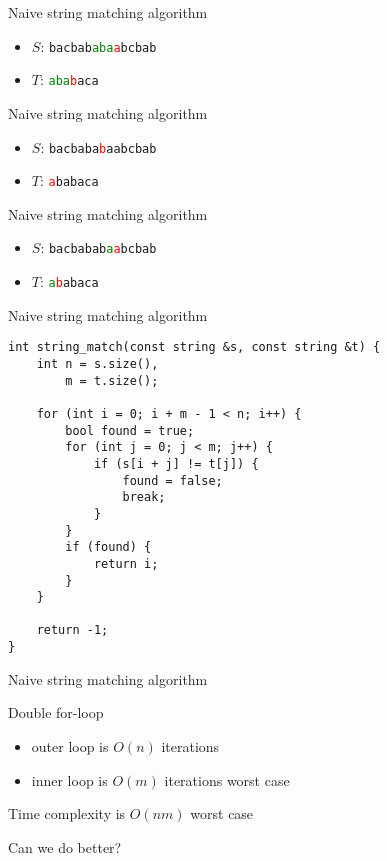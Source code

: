 \begin{frame}{Naive string matching algorithm}
    \begin{itemize}
        \item $S$: \texttt{bacbab\textcolor{green}{aba}\textcolor{red}{a}bcbab}
        \item $T$: \texttt{\textcolor{green}{aba}\textcolor{red}{b}aca}
    \end{itemize}
\end{frame}
\begin{frame}{Naive string matching algorithm}
    \begin{itemize}
        \item $S$: \texttt{bacbaba\textcolor{red}{b}aabcbab}
        \item $T$: \texttt{\textcolor{red}{a}babaca}
    \end{itemize}
\end{frame}
\begin{frame}{Naive string matching algorithm}
    \begin{itemize}
        \item $S$: \texttt{bacbabab\textcolor{green}{a}\textcolor{red}{a}bcbab}
        \item $T$: \texttt{\textcolor{green}{a}\textcolor{red}{b}abaca}
    \end{itemize}
\end{frame}

\begin{frame}[fragile]{Naive string matching algorithm}
    \begin{verbatim}
int string_match(const string &s, const string &t) {
    int n = s.size(),
        m = t.size();

    for (int i = 0; i + m - 1 < n; i++) {
        bool found = true;
        for (int j = 0; j < m; j++) {
            if (s[i + j] != t[j]) {
                found = false;
                break;
            }
        }
        if (found) {
            return i;
        }
    }

    return -1;
}
    \end{verbatim}
\end{frame}

\begin{frame}{Naive string matching algorithm}
    \bi
        \item Double for-loop
            \begin{itemize}
                \item outer loop is $O(n)$ iterations
                \item inner loop is $O(m)$ iterations worst case
            \end{itemize}
        \item Time complexity is $O(nm)$ worst case
        \item<2-> Can we do better?
    \ei
\end{frame}

